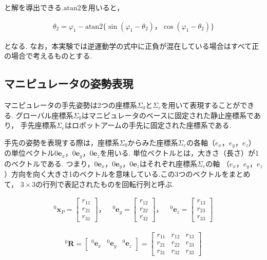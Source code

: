と解を導出できる.$\text{atan2}$を用いると，

\begin{align}
  \theta_2 = \varphi_1 - \text{atan2} \{ \sin(\varphi_1 - \theta_2)， \cos(\varphi_1 - \theta_2) \} \tag{2.14}
\end{align}

となる.
なお，本実験では逆運動学の式中に正負が混在している場合はすべて正の場合で考えるものとする.



\subsection{マニピュレータの姿勢表現}
マニピュレータの手先姿勢は2つの座標系$\Sigma_0$と$\Sigma_e$を用いて表現することができる.
グローバル座標系$\Sigma_0$はマニピュレータのベースに固定された静止座標系であり，
手先座標系$\Sigma_e$はロボットアームの手先に固定された座標系である.

手先の姿勢を表現する際は，座標系$\Sigma_0$からみた座標系$\Sigma_e$の各軸（$e_x， e_y， e_z$）
の単位ベクトル$0\mathbf{e}_x， 0\mathbf{e}_y， 0\mathbf{e}_z$を用いる.
単位ベクトルとは，大きさ（長さ）が1のベクトルである.
つまり，$0\mathbf{e}_x， 0\mathbf{e}_y， 0\mathbf{e}_z$はそれぞれ座標系$\Sigma_e$の軸
（$e_x， e_y， e_z$）方向を向く大きさ1のベクトルを意味している.この3つのベクトルをまとめて，
$3 \times 3$の行列で表記されたものを回転行列と呼ぶ.

\begin{align}
  ^0\mathbf{x}_{P} = \begin{bmatrix} r_{11} \\ r_{21} \\ r_{31} \end{bmatrix}， \quad ^0\mathbf{e}_y = \begin{bmatrix} r_{12} \\ r_{22} \\ r_{32} \end{bmatrix}， \quad ^0\mathbf{e}_z = \begin{bmatrix} r_{13} \\ r_{23} \\ r_{33} \end{bmatrix}
\end{align}

\begin{align}
  ^0\mathbf{R} = \begin{bmatrix} ^0\mathbf{e}_x & ^0\mathbf{e}_y & ^0\mathbf{e}_z \end{bmatrix} = \begin{bmatrix} r_{11} & r_{12} & r_{13} \\ r_{21} & r_{22} & r_{23} \\ r_{31} & r_{32} & r_{33} \end{bmatrix} \tag{2.16}
\end{align}

